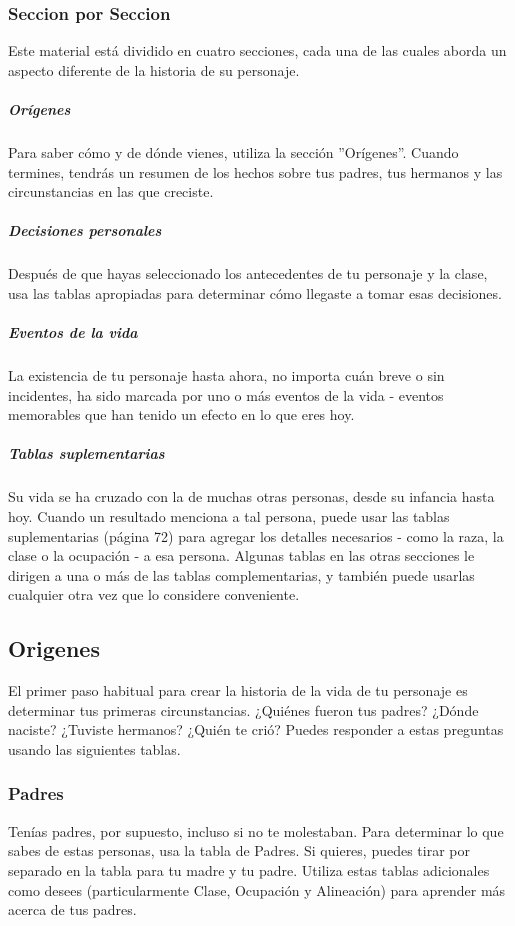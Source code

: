 \documentclass[a4paper,twocolumn,openany,10pt]{dndbook}
\begin{document}
\subsubsection*{Seccion por Seccion}

Este material está dividido en cuatro secciones, cada una de las cuales aborda un aspecto diferente de la historia de su
personaje.

\subparagraph{Orígenes} Para saber cómo y de dónde vienes, utiliza la sección ''Orígenes''. Cuando termines, tendrás un resumen
de los hechos sobre tus padres, tus hermanos y las circunstancias en las que creciste.

\subparagraph{Decisiones personales} Después de que hayas seleccionado los antecedentes de tu personaje y la clase, usa las
tablas apropiadas para determinar cómo llegaste a tomar esas decisiones.

\subparagraph{Eventos de la vida} La existencia de tu personaje hasta ahora, no importa cuán breve o sin incidentes, ha sido
marcada por uno o más eventos de la vida - eventos memorables que han tenido un efecto en lo que eres hoy.

\subparagraph{Tablas suplementarias} Su vida se ha cruzado con la de muchas otras personas, desde su infancia hasta hoy. Cuando
un resultado menciona a tal persona, puede usar las tablas suplementarias (página 72) para agregar los detalles necesarios -
como la raza, la clase o la ocupación - a esa persona. Algunas tablas en las otras secciones le dirigen a una o más de las
tablas complementarias, y también puede usarlas cualquier otra vez que lo considere conveniente. 

\subsection{Origenes}
El primer paso habitual para crear la historia de la vida de tu personaje es determinar tus primeras circunstancias. ¿Quiénes
fueron tus padres? ¿Dónde naciste? ¿Tuviste hermanos? ¿Quién te crió? Puedes responder a estas preguntas usando las siguientes
tablas.

\subsubsection*{Padres}
Tenías padres, por supuesto, incluso si no te molestaban. Para determinar lo que sabes de estas personas, usa la tabla de
Padres. Si quieres, puedes tirar por separado en la tabla para tu madre y tu padre. Utiliza estas tablas adicionales como
desees (particularmente Clase, Ocupación y Alineación) para aprender más acerca de tus padres.
\end{document}
